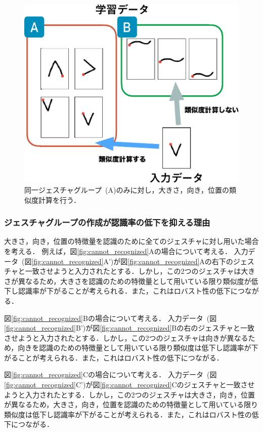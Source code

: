 \begin{figure} [h!]
	\begin{center}
		\includegraphics [width=0.6\hsize ]{img/speed_reason.eps}
	\end{center}
	\caption{同一ジェスチャグループ~(A)のみに対し，大きさ，向き，位置の類似度計算を行う．}
	\label{fig:speed_reason}
\end{figure}

\subsubsection{ジェスチャグループの作成が認識率の低下を抑える理由}

大きさ，向き，位置の特徴量を認識のために全てのジェスチャに対し用いた場合を考える．
例えば，図\ref{fig:cannot_recognized}Aの場合について考える．
入力データ~(図\ref{fig:cannot_recognized}A')が図\ref{fig:cannot_recognized}Aの右下のジェスチャと一致させようと入力されたとする．しかし，この2つのジェスチャは大きさが異なるため，大きさを認識のための特徴量として用いている限り類似度が低下し認識率が下がることが考えられる．また，これはロバスト性の低下につながる．

図\ref{fig:cannot_recognized}Bの場合について考える．
入力データ~(図\ref{fig:cannot_recognized}B')が図\ref{fig:cannot_recognized}Bの右のジェスチャと一致させようと入力されたとする．しかし，この2つのジェスチャは向きが異なるため，向きを認識のための特徴量として用いている限り類似度は低下し認識率が下がることが考えられる．また，これはロバスト性の低下につながる．

図\ref{fig:cannot_recognized}Cの場合について考える．
入力データ~(図\ref{fig:cannot_recognized}C')が図\ref{fig:cannot_recognized}Cのジェスチャと一致させようと入力されたとする．しかし，この2つのジェスチャは大きさ，向き，位置が異なるため，大きさ，向き，位置を認識のための特徴量として用いている限り類似度は低下し認識率が下がることが考えられる．また，これはロバスト性の低下につながる．

